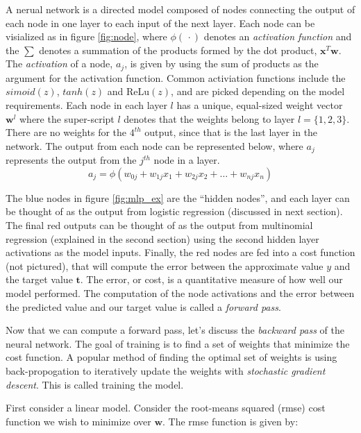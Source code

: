 \message{ !name(main.tex)}\documentclass[11pt]{article}
\begin{document}
A nerual network is a directed model composed of nodes connecting the output of each node in one layer to each input of the next layer. Each node can be visialized as in figure \ref{fig:node}, where $\phi(\,\cdotp)$ denotes an \emph{activation function} and the $\sum$ denotes a summation of the products formed by the dot product, $\mathbf{x}^{T}\mathbf{w}$. The \emph{activation} of a node, $a_{j}$, is given by using the sum of products as the argument for the activation function. Common activiation functions include the $simoid(z)$, $tanh(z)$ and $\mathrm{ReLu}(z)$, and are picked depending on the model requirements. Each node in each layer $l$ has a unique, equal-sized weight vector $\mathbf{w}^{l}$ where the super-script $l$ denotes that the weights belong to layer $l = \{1,2,3\}$. There are no weights for the $4^{th}$ output, since that is the last layer in the network. The output from each node can be represented below, where $a_j$ represents the output from the $j^{th}$ node in a layer.
\begin{equation}
  a_{j} = \phi\left(w_{0j} + w_{1j}x_{1} + w_{2j}x_{2} + \ldots + w_{nj}x_{n}\right)
\end{equation}
\par
The blue nodes in figure \ref{fig:mlp_ex} are the ``hidden nodes'', and each layer can be thought of as the output from logistic regression (discussed in next section). The final red outputs can be thought of as the output from multinomial regression (explained in the second section) using the second hidden layer activations as the model inputs. Finally, the red nodes are fed into a cost function (not pictured), that will compute the error between the approximate value $y$ and the target value $\mathbf{t}$. The error, or cost, is a quantitative measure of how well our model performed. The computation of the node activations and the error between the predicted value and our target value is called a \emph{forward pass}.
\par
Now that we can compute a forward pass, let's discuss the \emph{backward pass} of the neural network. The goal of training is to find a set of weights that minimize the cost function. A popular method of finding the optimal set of weights is using back-propogation to iteratively update the weights with \emph{stochastic gradient descent}. This is called training the model.

First consider a linear model. Consider the root-means squared (rmse) cost function we wish to minimize over $\mathbf{w}$. The rmse function is given by:
\end{document}
